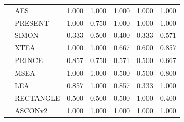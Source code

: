 \documentclass[12pt]{article}
\begin{document}
\begin{table}[h!]
{\begin{tabular}{|c|l|c|c|c|c|c|}
& AES & 1.000 & 1.000 & 1.000 & 1.000 & 1.000 \\
& PRESENT & 1.000 & 0.750 & 1.000 & 1.000 & 1.000 \\
& SIMON & 0.333 & 0.500 & 0.400 & 0.333 & 0.571 \\
& XTEA & 1.000 & 1.000 & 0.667 & 0.600 & 0.857 \\
& PRINCE & 0.857 & 0.750 & 0.571 & 0.500 & 0.667 \\
& MSEA & 1.000 & 1.000 & 0.500 & 0.500 & 0.800 \\
& LEA & 0.857 & 1.000 & 0.857 & 0.333 & 1.000 \\
& RECTANGLE & 0.500 & 0.500 & 0.500 & 1.000 & 0.400 \\
& ASCONv2 & 1.000 & 1.000 & 1.000 & 1.000 & 1.000 \\
\hline
\end{tabular}%
}
\end{table}

\newpage
\end{document}
